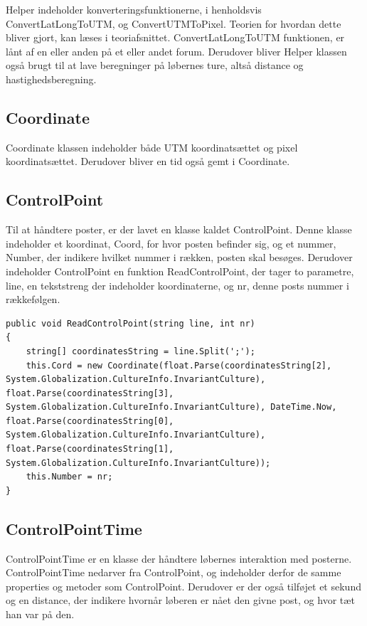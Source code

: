Helper indeholder konverteringsfunktionerne, i henholdsvis ConvertLatLongToUTM, og ConvertUTMToPixel. Teorien for hvordan dette bliver gjort, kan læses i teoriafsnittet.
ConvertLatLongToUTM funktionen, er lånt af en eller anden på et eller andet forum.
Derudover bliver Helper klassen også brugt til at lave beregninger på løbernes ture, altså distance og hastighedsberegning. 

\subsection{Coordinate}
Coordinate klassen indeholder både UTM koordinatsættet og pixel koordinatsættet. Derudover bliver en tid også gemt i Coordinate.

\subsection{ControlPoint}
Til at håndtere poster, er der lavet en klasse kaldet ControlPoint. Denne klasse indeholder et koordinat, Coord, for hvor posten befinder sig, og et nummer, Number, der indikere hvilket nummer i rækken, posten skal besøges. 
Derudover indeholder ControlPoint en funktion ReadControlPoint, der tager to parametre, line, en tekststreng der indeholder koordinaterne, og nr, denne posts nummer i rækkefølgen. 

\begin{lstlisting}
public void ReadControlPoint(string line, int nr)
{
    string[] coordinatesString = line.Split(';');
    this.Cord = new Coordinate(float.Parse(coordinatesString[2], System.Globalization.CultureInfo.InvariantCulture), float.Parse(coordinatesString[3], System.Globalization.CultureInfo.InvariantCulture), DateTime.Now, float.Parse(coordinatesString[0], System.Globalization.CultureInfo.InvariantCulture), float.Parse(coordinatesString[1], System.Globalization.CultureInfo.InvariantCulture));
    this.Number = nr;
}
\end{lstlisting}

\subsection{ControlPointTime}
ControlPointTime er en klasse der håndtere løbernes interaktion med posterne. ControlPointTime nedarver fra ControlPoint, og indeholder derfor de samme properties og metoder som ControlPoint. Derudover er der også tilføjet et sekund og en distance, der indikere hvornår løberen er nået den givne post, og hvor tæt han var på den. 

